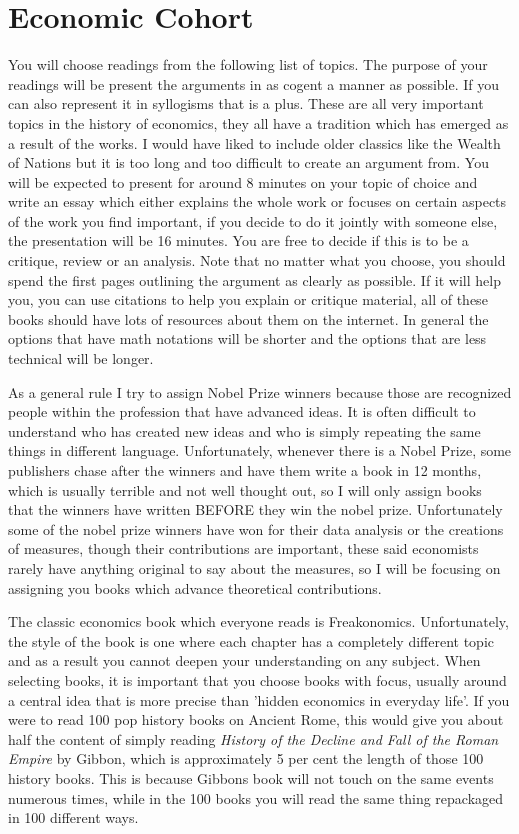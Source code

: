 \documentclass[12pt]{report}
\numberwithin{equation}{section}
\begin{document}
\chapter*{Economic Cohort}

You will choose readings from the following list of topics. The purpose of your readings will be present the arguments in as cogent a manner as possible. If you can also represent it in syllogisms that is a plus. These are all very important topics in the history of economics, they all have a tradition which has emerged as a result of the works. I would have liked to include older classics like the Wealth of Nations but it is too long and too difficult to create an argument from. You will be expected to present for around 8 minutes on your topic of choice and write an essay which either explains the whole work or focuses on certain aspects of the work you find important, if you decide to do it jointly with someone else, the presentation will be 16 minutes. You are free to decide if this is to be a critique, review or an analysis. Note that no matter what you choose, you should spend the first pages outlining the argument as clearly as possible. If it will help you, you can use citations to help you explain or critique material, all of these books should have lots of resources about them on the internet. In general the options that have math notations will be shorter and the options that are less technical will be longer. 

As a general rule I try to assign Nobel Prize winners because those are recognized people within the profession that have advanced ideas. It is often difficult to understand who has created new ideas and who is simply repeating the same things in different language. Unfortunately, whenever there is a Nobel Prize, some publishers chase after the winners and have them write a book in 12 months, which is usually terrible and not well thought out, so I will only assign books that the winners have written BEFORE they win the nobel prize. Unfortunately some of the nobel prize winners have won for their data analysis or the creations of measures, though their contributions are important, these said economists rarely have anything original to say about the measures, so I will be focusing on assigning you books which advance theoretical contributions. 

\newpage

The classic economics book which everyone reads is Freakonomics. Unfortunately, the style of the book is one where each chapter has a completely different topic and as a result you cannot deepen your understanding on any subject. When selecting books, it is important that you choose books with focus, usually around a central idea that is more precise than 'hidden economics in everyday life'. If you were to read 100 pop history books on Ancient Rome, this would give you about half the content of simply reading \textit{History of the Decline and Fall of the Roman Empire} by Gibbon, which is approximately 5 per cent the length of those 100 history books. This is because Gibbons book will not touch on the same events numerous times, while in the 100 books you will read the same thing repackaged in 100 different ways. 
\end{document}
